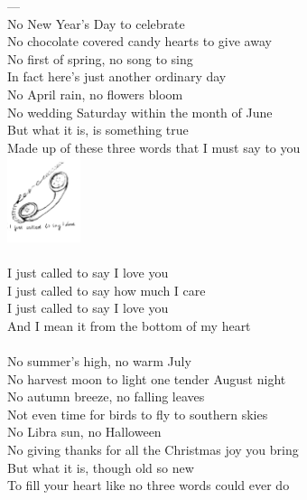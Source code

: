 \documentclass[a5paper, 10pt]{book}
\begin{document}
\begin{minipage}[t]{0.75\textwidth}
  ---\\

  No New Year's Day to celebrate 					\\
  No chocolate covered candy hearts to give away 			\\
  No first of spring, no song to sing 				\\
  In fact here's just another ordinary day\\
  No April rain, no flowers bloom\\
  No wedding Saturday within the month of June\\
  But what it is, is something true\\
  Made up of these three words that I must say to you\\
  \hspace*{7.4cm}\includegraphics[height=2.5cm]{images/stand_by_me.png}\vspace*{-2.6cm}\\
  \\
  \hspace*{5mm}I just called to say I love you 		\\
  \hspace*{5mm}I just called to say how much I care\\
  \hspace*{5mm}I just called to say I love you 		\\
  \hspace*{5mm}And I mean it from the bottom of my heart\\
  \\
  No summer's high, no warm July 				\\
  No harvest moon to light one tender August night 		\\
  No autumn breeze, no falling leaves 			\\
  Not even time for birds to fly to southern skies\\
  No Libra sun, no Halloween\\
  No giving thanks for all the Christmas joy you bring\\
  But what it is, though old so new\\
  To fill your heart like no three words could ever do\\
\end{minipage}
\end{document}
